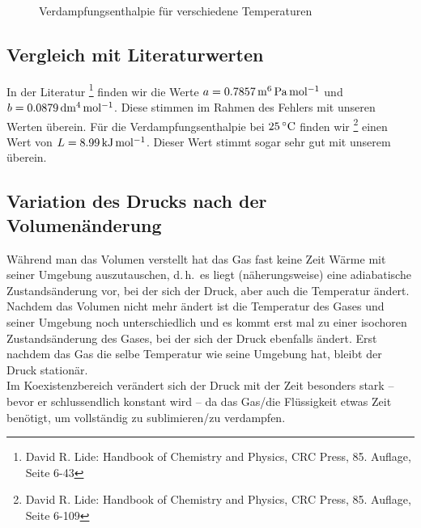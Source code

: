 \begin{figure}
    
    \caption{Verdampfungsenthalpie für verschiedene Temperaturen}
    \label{diag:L}
\end{figure}


\subsection{Vergleich mit Literaturwerten}

In der Literatur%
\footnote{David R. Lide: Handbook of Chemistry and Physics, CRC Press, 85. Auflage, Seite 6-43}
finden wir die Werte $a = \unit[0.7857]{m^6\, Pa\, mol^{-1}}$ und $b = \unit[0.0879]{dm^4\, mol^{-1}}$. Diese stimmen im Rahmen des Fehlers mit unseren Werten überein. Für die Verdampfungsenthalpie bei $\unit[25]{ ^\circ C}$ finden wir%
\footnote{David R. Lide: Handbook of Chemistry and Physics, CRC Press, 85. Auflage, Seite 6-109}
einen Wert von $L = \unit[8.99]{kJ\, mol^{-1}}$. Dieser Wert stimmt sogar sehr gut mit unserem überein.

\subsection{Variation des Drucks nach der Volumenänderung}

Während man das Volumen verstellt hat das Gas fast keine Zeit Wärme mit seiner Umgebung auszutauschen, d.\,h.\ es liegt (näherungsweise) eine adiabatische Zustandsänderung vor, bei der sich der Druck, aber auch die Temperatur ändert. Nachdem das Volumen nicht mehr ändert ist die Temperatur des Gases und seiner Umgebung noch unterschiedlich und es kommt erst mal zu einer isochoren Zustandsänderung des Gases, bei der sich der Druck ebenfalls ändert. Erst nachdem das Gas die selbe Temperatur wie seine Umgebung hat, bleibt der Druck stationär.\\
Im Koexistenzbereich verändert sich der Druck mit der Zeit besonders stark -- bevor er schlussendlich konstant wird -- da das Gas/die Flüssigkeit etwas Zeit benötigt, um vollständig zu sublimieren/zu verdampfen.

